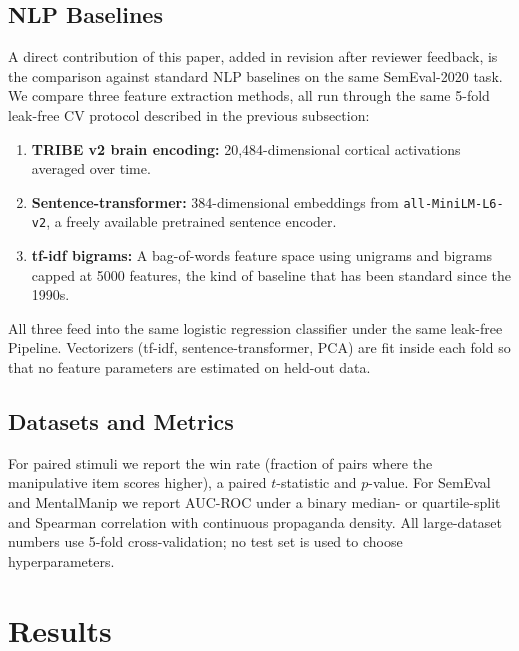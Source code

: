 \documentclass[11pt]{article}
\begin{document}
\subsection{NLP Baselines}
\label{sec:method-baselines}

A direct contribution of this paper, added in revision after reviewer feedback, is the comparison against standard NLP baselines on the same SemEval-2020 task. We compare three feature extraction methods, all run through the same 5-fold leak-free CV protocol described in the previous subsection:

\begin{enumerate}
    \item \textbf{TRIBE v2 brain encoding:} 20{,}484-dimensional cortical activations averaged over time.
    \item \textbf{Sentence-transformer:} 384-dimensional embeddings from \texttt{all-MiniLM-L6-v2}, a freely available pretrained sentence encoder.
    \item \textbf{tf-idf bigrams:} A bag-of-words feature space using unigrams and bigrams capped at 5000 features, the kind of baseline that has been standard since the 1990s.
\end{enumerate}

All three feed into the same logistic regression classifier under the same leak-free Pipeline. Vectorizers (tf-idf, sentence-transformer, PCA) are fit inside each fold so that no feature parameters are estimated on held-out data.

\subsection{Datasets and Metrics}

For paired stimuli we report the win rate (fraction of pairs where the manipulative item scores higher), a paired $t$-statistic and $p$-value. For SemEval and MentalManip we report AUC-ROC under a binary median- or quartile-split and Spearman correlation with continuous propaganda density. All large-dataset numbers use 5-fold cross-validation; no test set is used to choose hyperparameters.

\section{Results}
\label{sec:results}
\end{document}
